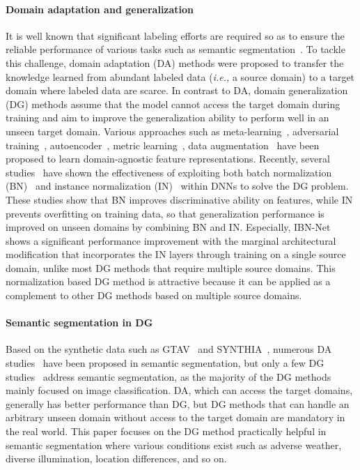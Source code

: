 \documentclass[final]{latex/cvpr}
\begin{document}
\paragraph{Domain adaptation and generalization}
It is well known that significant labeling efforts are required so as to ensure the reliable performance of various tasks such as semantic segmentation~\cite{long2015fully,badrinarayanan2017segnet,chen2017rethinking,zhu2019improving,choi2020cars}. To tackle this challenge, domain adaptation (DA) methods were proposed to transfer the knowledge learned from abundant labeled data (\textit{i.e.,} a source domain) to a target domain where labeled data are scarce. In contrast to DA, domain generalization (DG) methods assume that the model cannot access the target domain during training and aim to improve the generalization ability to perform well in an unseen target domain. Various approaches such as meta-learning~\cite{li2017learning,balaji2018metareg,li2019episodic,li2019feature}, 
adversarial training~\cite{li2018domain,li2018deep,rahman2020correlation}, autoencoder~\cite{Ghifary_2015_ICCV,li2018domain}, metric learning~\cite{dou2019domain,motiian2017unified}, 
data augmentation~\cite{yue2019domain,gong2019dlow,zhou2020learning} have been proposed to learn domain-agnostic feature representations.
Recently, several studies~\cite{pan2018two,seo2019learning} have shown the effectiveness of exploiting both batch normalization (BN)~\cite{ioffe2015batch} and instance normalization (IN)~\cite{ulyanov2016instance} within DNNs to solve the DG problem. These studies show that BN improves discriminative ability on features, while IN prevents overfitting on training data, so that generalization performance is improved on unseen domains by combining BN and IN. Especially, IBN-Net~\cite{pan2018two} shows a significant performance improvement with the marginal architectural modification that incorporates the IN layers through training on a single source domain, unlike most DG methods that require multiple source domains. 
This normalization based DG method is attractive because it can be applied as a complement to other DG methods based on multiple source domains.\vspace{-0.45cm}
\paragraph{Semantic segmentation in DG}
Based on the synthetic data such as GTAV~\cite{Richter_2016_ECCV} and SYNTHIA~\cite{Ros_2016_CVPR}, numerous DA studies~\cite{pan2020unsupervised,vu2019advent,saleh2018effective,chen2018road,zou2018unsupervised,hoffman2018cycada,tsai2018learning,ma2018exemplar,zhang2017curriculum} have been proposed in semantic segmentation, but only a few DG studies~\cite{yue2019domain,pan2018two} address semantic segmentation, as the majority of the DG methods mainly focused on image classification.
DA, which can access the target domains, generally has better performance than DG, but DG methods that can handle an arbitrary unseen domain without access to the target domain are mandatory in the real world. This paper focuses on the DG method practically helpful in semantic segmentation where various conditions exist such as adverse weather, diverse illumination, location differences, and so on.
\end{document}
